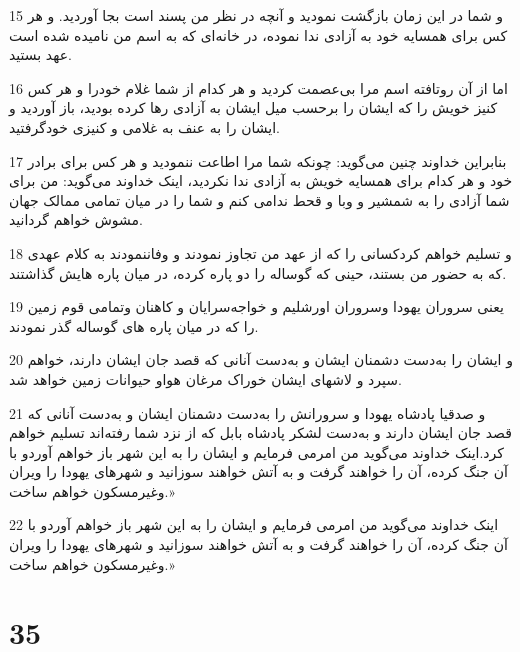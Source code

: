 \par 15 و شما در این زمان بازگشت نمودید و آنچه در نظر من پسند است بجا آوردید. و هر کس برای همسایه خود به آزادی ندا نموده، در خانه‌ای که به اسم من نامیده شده است عهد بستید.
\par 16 اما از آن روتافته اسم مرا بی‌عصمت کردید و هر کدام از شما غلام خودرا و هر کس کنیز خویش را که ایشان را برحسب میل ایشان به آزادی رها کرده بودید، باز آوردید و ایشان را به عنف به غلامی و کنیزی خودگرفتید.
\par 17 بنابراین خداوند چنین می‌گوید: چونکه شما مرا اطاعت ننمودید و هر کس برای برادر خود و هر کدام برای همسایه خویش به آزادی ندا نکردید، اینک خداوند می‌گوید: من برای شما آزادی را به شمشیر و وبا و قحط ندامی کنم و شما را در میان تمامی ممالک جهان مشوش خواهم گردانید.
\par 18 و تسلیم خواهم کردکسانی را که از عهد من تجاوز نمودند و وفاننمودند به کلام عهدی که به حضور من بستند، حینی که گوساله را دو پاره کرده، در میان پاره هایش گذاشتند.
\par 19 یعنی سروران یهودا وسروران اورشلیم و خواجه‌سرایان و کاهنان وتمامی قوم زمین را که در میان پاره های گوساله گذر نمودند.
\par 20 و ایشان را به‌دست دشمنان ایشان و به‌دست آنانی که قصد جان ایشان دارند، خواهم سپرد و لاشهای ایشان خوراک مرغان هواو حیوانات زمین خواهد شد.
\par 21 و صدقیا پادشاه یهودا و سرورانش را به‌دست دشمنان ایشان و به‌دست آنانی که قصد جان ایشان دارند و به‌دست لشکر پادشاه بابل که از نزد شما رفته‌اند تسلیم خواهم کرد.اینک خداوند می‌گوید من امرمی فرمایم و ایشان را به این شهر باز خواهم آوردو با آن جنگ کرده، آن را خواهند گرفت و به آتش خواهند سوزانید و شهرهای یهودا را ویران وغیرمسکون خواهم ساخت.»
\par 22 اینک خداوند می‌گوید من امرمی فرمایم و ایشان را به این شهر باز خواهم آوردو با آن جنگ کرده، آن را خواهند گرفت و به آتش خواهند سوزانید و شهرهای یهودا را ویران وغیرمسکون خواهم ساخت.»
 
\chapter{35}

